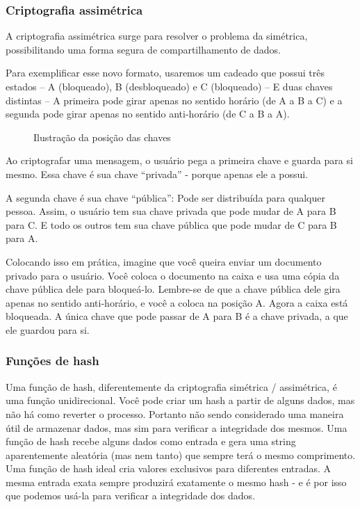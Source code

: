 \subsubsection{Criptografia assimétrica}
A criptografia assimétrica surge para resolver o problema da simétrica, possibilitando uma forma segura de compartilhamento de dados.

Para exemplificar esse novo formato, usaremos um cadeado que possui três estados – A (bloqueado), B (desbloqueado) e C (bloqueado) – E duas chaves distintas – A primeira pode girar apenas no sentido horário (de A a B a C) e a segunda pode girar apenas no sentido anti-horário (de C a B a A).

\vspace{1cm}
\begin{figure}[H] \centering 
  \caption{\label{cripto_keys} Ilustração da posição das chaves} 
\end{figure}

Ao criptografar uma mensagem, o usuário pega a primeira chave e guarda para si mesmo. Essa chave é sua chave ``privada'' - porque apenas ele a possui.

A segunda chave é sua chave ``pública'': Pode ser distribuída para qualquer pessoa. Assim, o usuário tem sua chave privada que pode mudar de A para B para C. E todo os outros tem sua chave pública que pode mudar de C para B para A.

Colocando isso em prática, imagine que você queira enviar um documento privado para o usuário. Você coloca o documento na caixa e usa uma cópia da chave pública dele para bloqueá-lo. Lembre-se de que a chave pública dele gira apenas no sentido anti-horário, e você a coloca na posição A. Agora a caixa está bloqueada. A única chave que pode passar de A para B é a chave privada, a que ele guardou para si.

\subsubsection{Funções de hash}
Uma função de hash, diferentemente da criptografia simétrica / assimétrica, é  uma função unidirecional.  Você  pode criar um hash a partir de alguns dados, mas não há como reverter o processo. Portanto não sendo considerado uma maneira útil de armazenar dados, mas sim para verificar a integridade dos mesmos.  Uma função de hash recebe alguns dados como entrada e gera uma string aparentemente aleatória (mas nem tanto) que sempre terá o mesmo comprimento. Uma função de hash ideal cria valores exclusivos para diferentes entradas. A mesma entrada exata sempre produzirá exatamente o mesmo hash - e é por isso que podemos usá-la para verificar a integridade dos dados.

